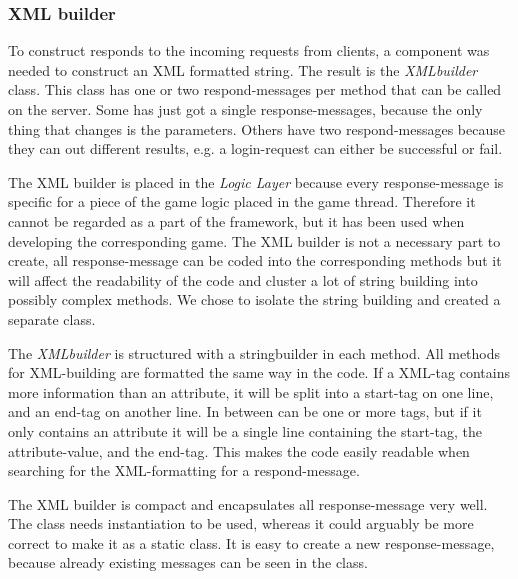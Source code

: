 \subsubsection{XML builder}
\label{sec:xmlbuilderimpl}
To construct responds to the incoming requests from clients, a component was needed to construct an XML formatted string. The result is the \textit{XMLbuilder} class. This class has one or two respond-messages per method that can be called on the server. Some has just got a single response-messages, because the only thing that changes is the parameters. Others have two respond-messages because they can out different results, e.g. a login-request can either be successful or fail. 

The XML builder is placed in the \textit{Logic Layer} because every response-message is specific for a piece of the game logic placed in the game thread. Therefore it cannot be regarded as a part of the framework, but it has been used when developing the corresponding game. The XML builder is not a necessary part to create, all response-message can be coded into the corresponding methods but it will affect the readability of the code and cluster a lot of string building into possibly complex methods. We chose to isolate the string building and created a separate class.

The \textit{XMLbuilder} is structured with a stringbuilder in each method. All methods for XML-building are formatted the same way in the code. If a XML-tag contains more information than an attribute, it will be split into a start-tag on one line, and an end-tag on another line. In between can be one or more tags, but if it only contains an attribute it will be a single line containing the start-tag, the attribute-value, and the end-tag. This makes the code easily readable when searching for the XML-formatting for a respond-message. 

The XML builder is compact and encapsulates all response-message very well. The class needs instantiation to be used, whereas it could arguably be more correct to make it as a static class. It is easy to create a new response-message, because already existing messages can be seen in the class.